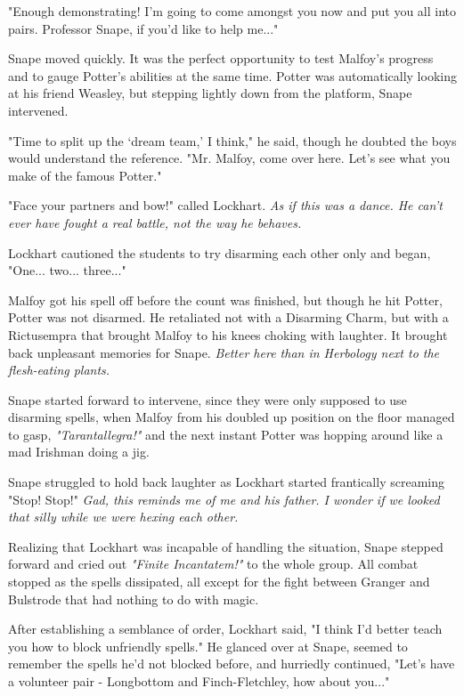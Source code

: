 \documentclass[a4paper,11pt]{article}
\begin{document}
"Enough demonstrating! I'm going to come amongst you now and put you all into pairs. Professor Snape, if you'd like to help me..."

Snape moved quickly. It was the perfect opportunity to test Malfoy's progress and to gauge Potter's abilities at the same time. Potter was automatically looking at his friend Weasley, but stepping lightly down from the platform, Snape intervened.

"Time to split up the `dream team,' I think," he said, though he doubted the boys would understand the reference. "Mr. Malfoy, come over here. Let's see what you make of the famous Potter."

"Face your partners and bow!" called Lockhart. \emph{As if this was a dance. He can't ever have fought a real battle, not the way he behaves.}

Lockhart cautioned the students to try disarming each other only and began, "One... two... three..."

Malfoy got his spell off before the count was finished, but though he hit Potter, Potter was not disarmed. He retaliated not with a Disarming Charm, but with a Rictusempra that brought Malfoy to his knees choking with laughter. It brought back unpleasant memories for Snape. \emph{Better here than in Herbology next to the flesh-eating plants.}

Snape started forward to intervene, since they were only supposed to use disarming spells, when Malfoy from his doubled up position on the floor managed to gasp, \emph{"Tarantallegra!"} and the next instant Potter was hopping around like a mad Irishman doing a jig.

Snape struggled to hold back laughter as Lockhart started frantically screaming "Stop! Stop!" \emph{Gad, this reminds me of me and his father. I wonder if we looked that silly while we were hexing each other.}

Realizing that Lockhart was incapable of handling the situation, Snape stepped forward and cried out \emph{"Finite Incantatem!"} to the whole group. All combat stopped as the spells dissipated, all except for the fight between Granger and Bulstrode that had nothing to do with magic.

After establishing a semblance of order, Lockhart said, "I think I'd better teach you how to block unfriendly spells." He glanced over at Snape, seemed to remember the spells he'd not blocked before, and hurriedly continued, "Let's have a volunteer pair - Longbottom and Finch-Fletchley, how about you..."
\end{document}

